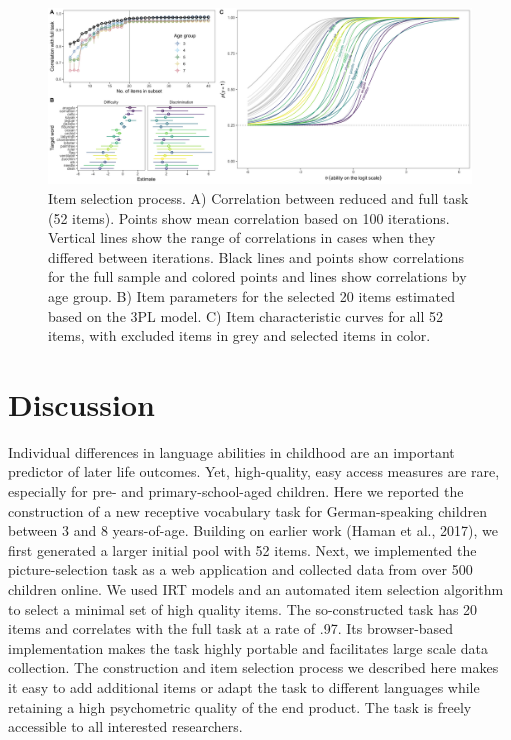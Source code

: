 \documentclass[
  man,floatsintext]{apa6}
\begin{document}
\begin{figure}

{\centering \includegraphics[width=1\linewidth]{../graphs/item_fig2} 

}

\caption{Item selection process. A) Correlation between reduced and full task (52 items). Points show mean correlation based on 100 iterations. Vertical lines show the range of correlations in cases when they differed between iterations. Black lines and points show correlations for the full sample and colored points and lines show correlations by age group. B) Item parameters for the selected 20 items estimated based on the 3PL model. C) Item characteristic curves for all 52 items, with excluded items in grey and selected items in color.}\label{fig:fig4}
\end{figure}

\hypertarget{discussion}{%
\section{Discussion}\label{discussion}}

Individual differences in language abilities in childhood are an important predictor of later life outcomes. Yet, high-quality, easy access measures are rare, especially for pre- and primary-school-aged children. Here we reported the construction of a new receptive vocabulary task for German-speaking children between 3 and 8 years-of-age. Building on earlier work (Haman et al., 2017), we first generated a larger initial pool with 52 items. Next, we implemented the picture-selection task as a web application and collected data from over 500 children online. We used IRT models and an automated item selection algorithm to select a minimal set of high quality items. The so-constructed task has 20 items and correlates with the full task at a rate of .97. Its browser-based implementation makes the task highly portable and facilitates large scale data collection. The construction and item selection process we described here makes it easy to add additional items or adapt the task to different languages while retaining a high psychometric quality of the end product. The task is freely accessible to all interested researchers.
\end{document}

